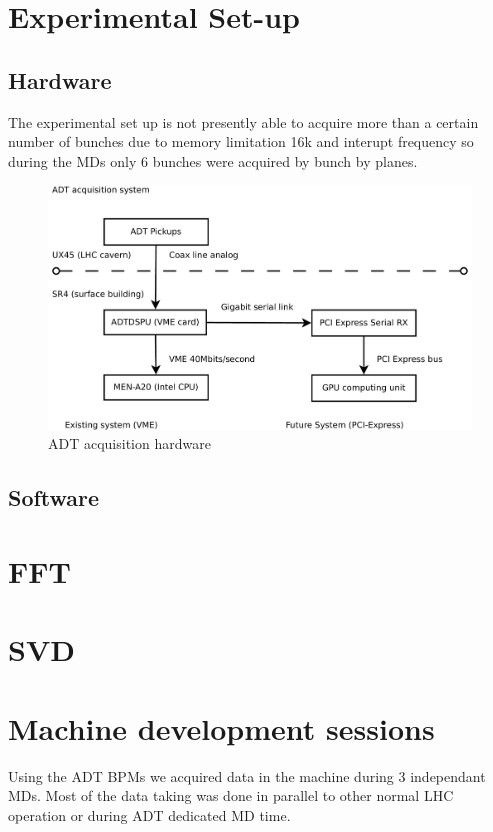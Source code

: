 \section{Experimental Set-up}

   \subsection{Hardware}

	The experimental set up is not presently able to acquire more than a certain number of bunches due to memory limitation 16k and interupt frequency so during the \glspl{MD} only 6 bunches were acquired by bunch by planes.

\begin{figure}
\caption{ADT acquisition hardware}
\centering
\includegraphics[scale=0.3]{acquisition.pdf}
\end{figure}

   \subsection{Software}

\section{FFT}

\section{SVD}

\section{Machine development sessions}

Using the \gls{ADT} \glspl{BPM} we acquired data in the machine during 3 independant \glspl{MD}. Most of the data taking was done in parallel to other normal LHC operation or during \gls{ADT} dedicated \gls{MD} time.

